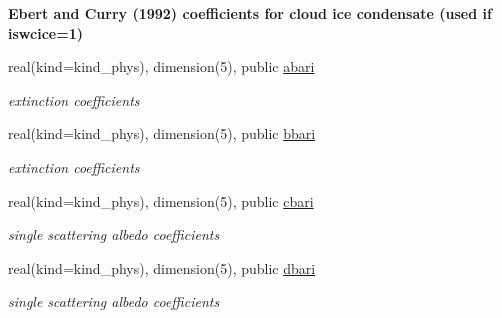 \begin{Indent}\textbf{ Ebert and Curry (1992) coefficients for cloud ice condensate (used if iswcice=1)}\par
\begin{DoxyCompactItemize}
\item 
\mbox{\label{namespacemodule__radsw__cldprtb_ace960bbbf15ab3cadbee76301ff111dd}} 
real(kind=kind\+\_\+phys), dimension(5), public \hyperlink{namespacemodule__radsw__cldprtb_ace960bbbf15ab3cadbee76301ff111dd}{abari}
\begin{DoxyCompactList}\small\item\em extinction coefficients \end{DoxyCompactList}\item 
\mbox{\label{namespacemodule__radsw__cldprtb_ad5342321ccd4759cb70f7a673620ee19}} 
real(kind=kind\+\_\+phys), dimension(5), public \hyperlink{namespacemodule__radsw__cldprtb_ad5342321ccd4759cb70f7a673620ee19}{bbari}
\begin{DoxyCompactList}\small\item\em extinction coefficients \end{DoxyCompactList}\item 
\mbox{\label{namespacemodule__radsw__cldprtb_ae7f1de5c9736894ac7b54c0e0d312f16}} 
real(kind=kind\+\_\+phys), dimension(5), public \hyperlink{namespacemodule__radsw__cldprtb_ae7f1de5c9736894ac7b54c0e0d312f16}{cbari}
\begin{DoxyCompactList}\small\item\em single scattering albedo coefficients \end{DoxyCompactList}\item 
\mbox{\label{namespacemodule__radsw__cldprtb_af8b02590603ea2f838d954cb0a93bbeb}} 
real(kind=kind\+\_\+phys), dimension(5), public \hyperlink{namespacemodule__radsw__cldprtb_af8b02590603ea2f838d954cb0a93bbeb}{dbari}
\begin{DoxyCompactList}\small\item\em single scattering albedo coefficients \end{DoxyCompactList}\item 
\mbox{\label{namespacemodule__radsw__cldprtb_a3cc7ab844ca564bd3df02a687bbc2f43}} 

\end{DoxyCompactItemize}
\end{Indent}
